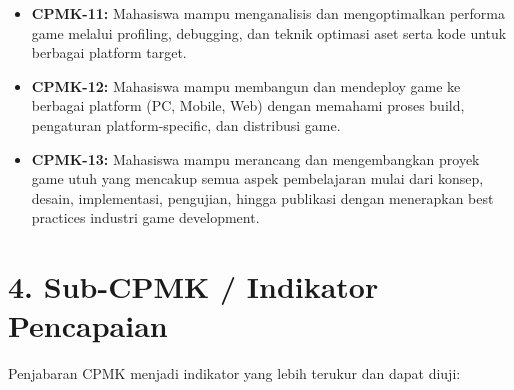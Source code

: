 \documentclass[12pt,a4paper]{article}
\begin{document}
\begin{itemize}[leftmargin=*]
  \item \textbf{CPMK-11:} Mahasiswa mampu menganalisis dan mengoptimalkan performa game melalui profiling, debugging, dan teknik optimasi aset serta kode untuk berbagai platform target.
  
  \item \textbf{CPMK-12:} Mahasiswa mampu membangun dan mendeploy game ke berbagai platform (PC, Mobile, Web) dengan memahami proses build, pengaturan platform-specific, dan distribusi game.
  
  \item \textbf{CPMK-13:} Mahasiswa mampu merancang dan mengembangkan proyek game utuh yang mencakup semua aspek pembelajaran mulai dari konsep, desain, implementasi, pengujian, hingga publikasi dengan menerapkan best practices industri game development.
\end{itemize}

\vspace{0.5cm}

\section*{4. Sub-CPMK / Indikator Pencapaian}

Penjabaran CPMK menjadi indikator yang lebih terukur dan dapat diuji:
\end{document}
